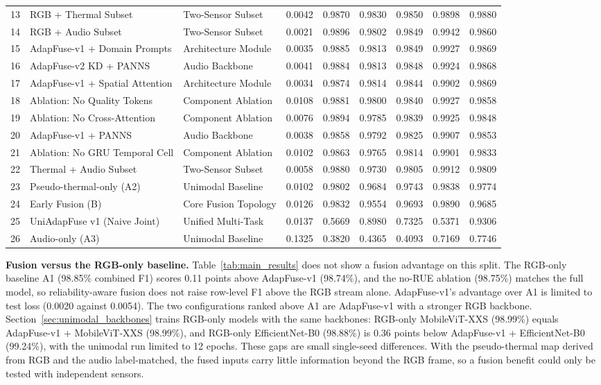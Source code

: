 \documentclass[journal]{IEEEtran}
\begin{document}
\begin{table}[!t]
{\begin{tabular}{@{}rllcccccc@{}}
13 & RGB + Thermal Subset & Two-Sensor Subset & 0.0042 & 0.9870 & 0.9830 & 0.9850 & 0.9898 & 0.9880 \\
14 & RGB + Audio Subset & Two-Sensor Subset & 0.0021 & 0.9896 & 0.9802 & 0.9849 & 0.9942 & 0.9860 \\
15 & AdapFuse-v1 + Domain Prompts & Architecture Module & 0.0035 & 0.9885 & 0.9813 & 0.9849 & 0.9927 & 0.9869 \\
16 & AdapFuse-v2 KD + PANNS & Audio Backbone & 0.0041 & 0.9884 & 0.9813 & 0.9848 & 0.9924 & 0.9868 \\
17 & AdapFuse-v1 + Spatial Attention & Architecture Module & 0.0034 & 0.9874 & 0.9814 & 0.9844 & 0.9902 & 0.9869 \\
18 & Ablation: No Quality Tokens & Component Ablation & 0.0108 & 0.9881 & 0.9800 & 0.9840 & 0.9927 & 0.9858 \\
19 & Ablation: No Cross-Attention & Component Ablation & 0.0076 & 0.9894 & 0.9785 & 0.9839 & 0.9925 & 0.9848 \\
20 & AdapFuse-v1 + PANNS & Audio Backbone & 0.0038 & 0.9858 & 0.9792 & 0.9825 & 0.9907 & 0.9853 \\
21 & Ablation: No GRU Temporal Cell & Component Ablation & 0.0102 & 0.9863 & 0.9765 & 0.9814 & 0.9901 & 0.9833 \\
22 & Thermal + Audio Subset & Two-Sensor Subset & 0.0058 & 0.9880 & 0.9730 & 0.9805 & 0.9912 & 0.9809 \\
23 & Pseudo-thermal-only (A2) & Unimodal Baseline & 0.0102 & 0.9802 & 0.9684 & 0.9743 & 0.9838 & 0.9774 \\
24 & Early Fusion (B) & Core Fusion Topology & 0.0126 & 0.9832 & 0.9554 & 0.9693 & 0.9890 & 0.9685 \\
25 & UniAdapFuse v1 (Naive Joint) & Unified Multi-Task & 0.0137 & 0.5669 & 0.8980 & 0.7325 & 0.5371 & 0.9306 \\
26 & Audio-only (A3) & Unimodal Baseline & 0.1325 & 0.3820 & 0.4365 & 0.4093 & 0.7169 & 0.7746 \\
\bottomrule
\end{tabular}%
}
\end{table}

\textbf{Fusion versus the RGB-only baseline.} Table~\ref{tab:main_results} does not show a fusion advantage on this split. The RGB-only baseline A1 (98.85\% combined F1) scores 0.11 points above AdapFuse-v1 (98.74\%), and the no-RUE ablation (98.75\%) matches the full model, so reliability-aware fusion does not raise row-level F1 above the RGB stream alone. AdapFuse-v1's advantage over A1 is limited to test loss (0.0020 against 0.0054). The two configurations ranked above A1 are AdapFuse-v1 with a stronger RGB backbone. Section~\ref{sec:unimodal_backbones} trains RGB-only models with the same backbones: RGB-only MobileViT-XXS (98.99\%) equals AdapFuse-v1 + MobileViT-XXS (98.99\%), and RGB-only EfficientNet-B0 (98.88\%) is 0.36 points below AdapFuse-v1 + EfficientNet-B0 (99.24\%), with the unimodal run limited to 12 epochs. These gaps are small single-seed differences. With the pseudo-thermal map derived from RGB and the audio label-matched, the fused inputs carry little information beyond the RGB frame, so a fusion benefit could only be tested with independent sensors.
\end{document}
